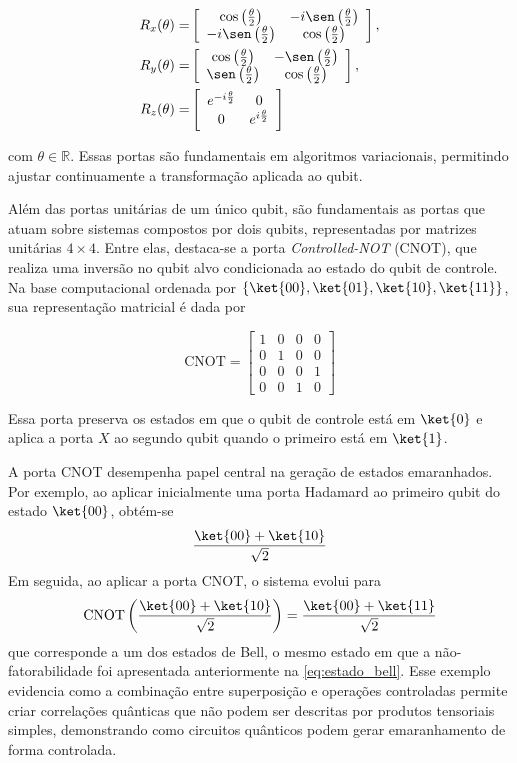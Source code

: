 \begin{align}
    R_x(\theta)= &
    \left[\begin{array}{cc}
        \cos\left(\frac{\theta}{2}\right) & -i\sen\left(\frac{\theta}{2}
        \right)\\
        -i\sen\left(\frac{\theta}{2}\right) & \cos\left(\frac{\theta}{2}
        \right)
    \end{array}\right], \\
    R_y(\theta)= &
    \left[\begin{array}{cc}
        \cos\left(\frac{\theta}{2}\right) & -\sen\left(\frac{\theta}{2}
        \right)\\
        \sen\left(\frac{\theta}{2}\right) & \cos\left(\frac{\theta}{2}
        \right)
    \end{array}\right], \\
    R_z(\theta)= &
    \left[\begin{array}{cc}
        e^{-i\frac{\theta}{2}} & 0\\
        0 & e^{i\frac{\theta}{2}}
    \end{array} \right]
\end{align}

\noindent com $\theta\in\mathbb{R}$. Essas portas são fundamentais em algoritmos variacionais, permitindo ajustar continuamente a transformação aplicada ao qubit.

Além das portas unitárias de um único qubit, são fundamentais as portas que atuam sobre sistemas compostos por dois qubits, representadas por matrizes unitárias $4\times4$. Entre elas, destaca-se a porta \textit{Controlled-NOT} (CNOT), que realiza uma inversão no qubit alvo condicionada ao estado do qubit de controle. Na base computacional ordenada por $\{\ket{00},\ket{01},\ket{10},\ket{11}\}$, sua representação matricial é dada por

$$
    \mathrm{CNOT}= \left[
    \begin{array}{cccc}
        1 & 0 & 0 & 0\\
        0 & 1 & 0 & 0\\
        0 & 0 & 0 & 1\\
        0 & 0 & 1 & 0
    \end{array} \right]
$$

Essa porta preserva os estados em que o qubit de controle está em $\ket{0}$ e aplica a porta $X$ ao segundo qubit quando o primeiro está em $\ket{1}$.

A porta CNOT desempenha papel central na geração de estados emaranhados. Por exemplo, ao aplicar inicialmente uma porta Hadamard ao primeiro qubit do estado $\ket{00}$, obtém-se
$$
\frac{\ket{00}+\ket{10}}{\sqrt{2}}
$$
Em seguida, ao aplicar a porta CNOT, o sistema evolui para
$$
\mathrm{CNOT}\left(\frac{\ket{00}+\ket{10}}{\sqrt{2}}\right)
=
\frac{\ket{00}+\ket{11}}{\sqrt{2}}
$$
que corresponde a um dos estados de Bell, o mesmo estado em que a não-fatorabilidade foi apresentada anteriormente na \autoref{eq:estado_bell}. Esse exemplo evidencia como a combinação entre superposição e operações controladas permite criar correlações quânticas que não podem ser descritas por produtos tensoriais simples, demonstrando como circuitos quânticos podem gerar emaranhamento de forma controlada.

